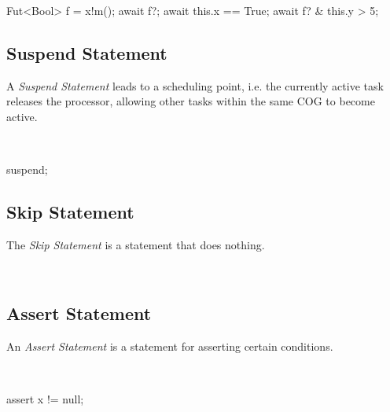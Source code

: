 \begin{abssyntax}
   {}\ \ \TRS{;}\\
       {}
               {} 
               {}\ \TRS{\&}\ \\
  {}\ 
               {}\ 
\end{abssyntax}

\begin{absexample}
Fut<Bool> f = x!m();
await f?;
await this.x == True;
await f? & this.y > 5;
\end{absexample}

\subsection{Suspend Statement}
A \emph{Suspend Statement} leads to a scheduling point, i.e. the currently active task releases the processor, allowing other tasks within the same COG to become active.

\begin{abssyntax}
  {}\ \TRS{;}
\end{abssyntax}

\begin{absexample}
suspend;
\end{absexample}

\subsection{Skip Statement}
The \emph{Skip Statement} is a statement that does nothing.

\begin{abssyntax}
  {}\ \TRS{;}
\end{abssyntax}

\subsection{Assert Statement}\label{sec:abs:assert}
An \emph{Assert Statement} is a statement for asserting certain conditions.
\newpage

\begin{abssyntax}
  {}\ \ \TRS{;}
\end{abssyntax}

\begin{absexample}
assert x != null;
\end{absexample}

